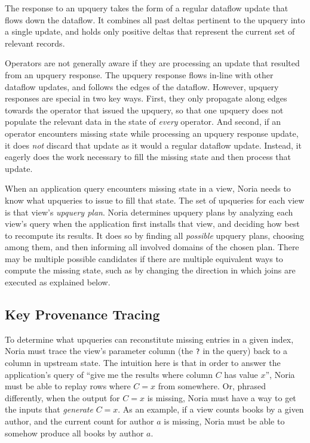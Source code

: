 The response to an upquery takes the form of a regular dataflow update that
flows down the dataflow. It combines all past deltas pertinent to the upquery
into a single update, and holds only positive deltas that represent the current
set of relevant records.

Operators are not generally aware if they are processing an update that resulted
from an upquery response. The upquery response flows in-line with other dataflow
updates, and follows the edges of the dataflow. However, upquery responses are
special in two key ways. First, they only propagate along edges towards the
operator that issued the upquery, so that one upquery does not populate the
relevant data in the state of \emph{every} operator. And second, if an operator
encounters missing state while processing an upquery response update, it does
\emph{not} discard that update as it would a regular dataflow update. Instead,
it eagerly does the work necessary to fill the missing state and then process
that update.

When an application query encounters missing state in a view, Noria needs to
know what upqueries to issue to fill that state. The set of upqueries for each
view is that view's \textit{upquery plan}. Noria determines upquery plans by
analyzing each view's query when the application first installs that view, and
deciding how best to recompute its results. It does so by finding all
\emph{possible} upquery plans, choosing among them, and then informing all
involved domains of the chosen plan. There may be multiple possible candidates
if there are multiple equivalent ways to compute the missing state, such as by
changing the direction in which joins are executed as explained below.

\subsection{Key Provenance Tracing}

To determine what upqueries can reconstitute missing entries in a given index,
Noria must trace the view's parameter column (the \texttt{?} in the query) back
to a column in upstream state. The intuition here is that in order to answer the
application's query of ``give me the results where column $C$ has value $x$'',
Noria must be able to replay rows where $C = x$ from somewhere. Or, phrased
differently, when the output for $C = x$ is missing, Noria must have a way to
get the inputs that \emph{generate} $C = x$. As an example, if a view counts
books by a given author, and the current count for author $a$ is missing, Noria
must be able to somehow produce all books by author $a$.

